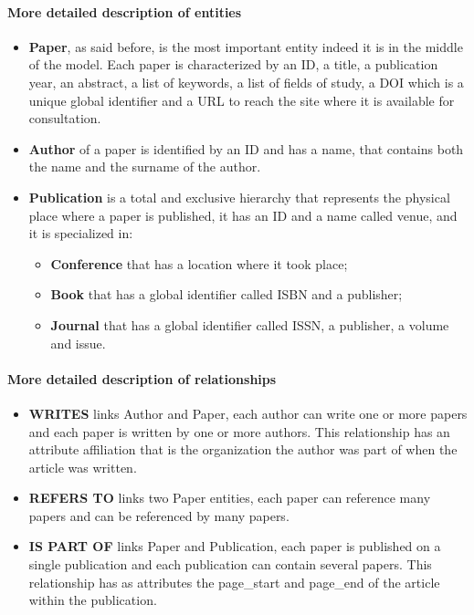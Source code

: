 \paragraph{More detailed description of entities}
\begin{itemize}
    \item \textbf{Paper}, as said before, is the most important entity indeed it is in the middle of the model.
    Each paper is characterized by an ID, a title, a publication year, an abstract, a list of keywords, a list of fields of study, a DOI which is a unique global identifier and a URL to reach the site where it is available for consultation.
    \item \textbf{Author} of a paper is identified by an ID and has a name, that contains both the name and the surname of the author.
    \item \textbf{Publication} is a total and exclusive hierarchy that represents the physical place where a paper is published, it has an ID and a name called venue, and it is specialized in:
    \begin{itemize}
        \item \textbf{Conference} that has a location where it took place;
        \item \textbf{Book} that has a global identifier called ISBN and a publisher;
        \item \textbf{Journal} that has a global identifier called ISSN, a publisher, a volume and issue.
    \end{itemize}
\end{itemize}

\paragraph{More detailed description of relationships}
\begin{itemize}
    \item \textbf{WRITES} links Author and Paper, each author can write one or more papers and each paper is written by one or more authors.
    This relationship has an attribute affiliation that is the organization the author was part of when the article was written.
    \item \textbf{REFERS TO} links two Paper entities, each paper can reference many papers and can be referenced by many papers.
    \item \textbf{IS PART OF} links Paper and Publication, each paper is published on a single publication and each publication can contain several papers.
    This relationship has as attributes the page\_start and page\_end of the article within the publication.
\end{itemize}

